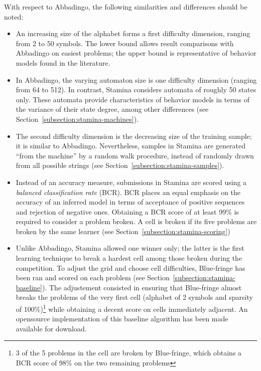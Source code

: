 With respect to Abbadingo, the following similarities and differences should be noted:

\begin{itemize}

\item An increasing size of the alphabet forms a first difficulty dimension, ranging from 2 to 50 symbols. The lower bound allows result comparisons with Abbadingo on easiest problems; the upper bound is representative of behavior models found in the literature.

\item In Abbadingo, the varying automaton size is one difficulty dimension (ranging from 64 to 512). In contrast, Stamina considers automata of roughly 50 states only. These automata provide characteristics of behavior models in terms of the variance of their state degree, among other differences (see Section~\ref{subsection:stamina-machines}).

\item The second difficulty dimension is the decreasing size of the training sample; it is similar to Abbadingo. Nevertheless, samples in Stamina are generated ``from the machine'' by a random walk procedure, instead of randomly drawn from all possible strings (see Section~\ref{subsection:stamina-samples}).

\item Instead of an accuracy measure, submissions in Stamina are scored using a \emph{balanced classification rate} (BCR). BCR places an equal emphasis on the accuracy of an inferred model in terms of acceptance of positive sequences and rejection of negative ones. Obtaining a BCR score of at least 99\% is required to consider a problem broken. A cell is broken if its five problems are broken by the same learner (see Section~\ref{subsection:stamina-scoring})

\item Unlike Abbadingo, Stamina allowed one winner only; the latter is the first learning technique to break a hardest cell among those broken during the competition. To adjust the grid and choose cell difficulties, Blue-fringe has been ran and scored on each problem (see Section~\ref{subsection:stamina-baseline}). The adjustement consisted in ensuring that Blue-fringe almost breaks the problems of the very first cell (alphabet of 2 symbols and sparsity of 100\%)\footnote{3 of the 5 problems in the cell are broken by Blue-fringe, which obtains a BCR score of 98\% on the two remaining problems} while obtaining a decent score on cells immediately adjacent. An opensource implementation of this baseline algorithm has been made available for download.

\end{itemize}

